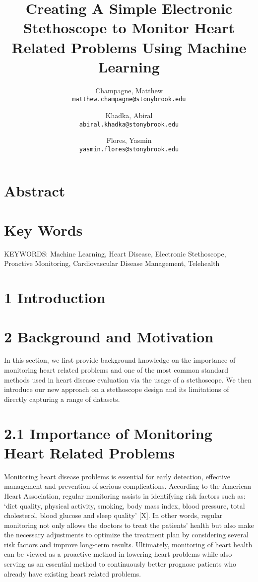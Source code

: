 \documentclass[twocolumn]{article}
\begin{document}
\title{Creating A Simple Electronic Stethoscope to Monitor Heart Related Problems Using Machine Learning}
\author{
  Champagne, Matthew \\
  \texttt{matthew.champagne@stonybrook.edu}
  \and
  Khadka, Abiral \\
  \texttt{abiral.khadka@stonybrook.edu}
  \and
  Flores, Yasmin \\
  \texttt{yasmin.flores@stonybrook.edu}
}

\maketitle
\section{Abstract} 

\section{Key Words} 
KEYWORDS: Machine Learning, Heart Disease, Electronic Stethoscope, Proactive Monitoring, Cardiovascular Disease Management, Telehealth 

\section{1 Introduction}

\section{2 Background and Motivation} 
In this section, we first provide background knowledge on the importance of monitoring heart related problems and one of the most common standard methods used in heart disease evaluation via the usage of a stethoscope. We then introduce our new approach on a stethoscope design and its limitations of directly capturing a range of datasets.

\section{2.1 Importance of Monitoring Heart Related Problems} 
Monitoring heart disease problems is essential for early detection, effective management and prevention of serious complications. According to the American Heart Association, regular monitoring assists in identifying risk factors such as: ‘diet quality, physical activity, smoking, body mass index, blood pressure, total cholesterol, blood glucose and sleep quality’ [X]. In other words, regular monitoring not only allows the doctors to treat the patients’ health but also make the necessary adjustments to optimize the treatment plan by considering several risk factors and improve long-term results. Ultimately, monitoring of heart health can be viewed as a proactive method in lowering heart problems while also serving as an essential method to continuously better prognose patients who already have existing heart related problems. 
\end{document}
